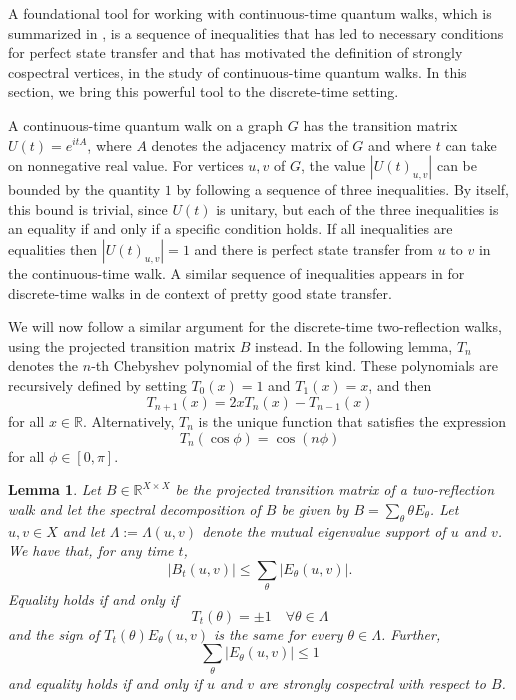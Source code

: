 \documentclass{article}
\newtheorem{lemma}[theorem]{Lemma}
\numberwithin{equation}{section}
\newcommand\re{{\mathbb R}}%
\begin{document}
A foundational tool for working with continuous-time quantum walks, which is summarized in \cite[Section 7.1]{CouGod2023book}, is a sequence of inequalities that has led to necessary conditions for perfect state transfer and that has motivated the definition of strongly cospectral vertices, in the study of continuous-time quantum walks.
In this section, we bring this powerful tool to the discrete-time setting.

A continuous-time quantum walk on a graph $G$ has the transition matrix
$U(t) = e^{itA}$,
where $A$ denotes the adjacency matrix of $G$ and where $t$ can take on nonnegative real value. For vertices $u,v$ of $G$,  the value $|U(t)_{u,v}|$ can be bounded by the quantity $1$ by following a sequence of three inequalities. By itself, this bound is trivial, since $U(t)$ is unitary, but each of the three inequalities is an equality if and only if a specific condition holds. If all inequalities are equalities then $|U(t)_{u,v}| = 1$ and there is perfect state transfer from $u$ to $v$ in the continuous-time walk. A similar sequence of inequalities appears in \cite{ChaZha2023} for discrete-time walks in de context of pretty good state transfer.

We will now follow a similar argument for the discrete-time two-reflection walks,  using the projected transition matrix $B$ instead. In the following lemma, $T_n$ denotes the $n$-th Chebyshev polynomial of the first kind. These polynomials are recursively defined by setting $T_0(x) = 1$ and $T_1(x) = x$, and then 
\[
T_{n+1}(x) = 2xT_n(x) - T_{n-1}(x)
\]
for all $x \in \re$. Alternatively, $T_n$ is the unique function that satisfies the expression
\begin{equation}
\label{eq:chebyshev_expression}
T_n(\cos\phi) = \cos(n\phi)
\end{equation}
for all $\phi \in [0,\pi]$.

\begin{lemma}
\label{lem:technical_lemma}
    Let $B \in \re^{X \times X}$ be the projected transition matrix of a two-reflection walk and let the spectral decomposition of $B$ be given by $B = \sum_{\theta} \theta E_{\theta}$. Let $u,v \in X$ and let $\Lambda := \Lambda(u,v)$ denote the mutual eigenvalue support of $u$ and $v$. We have that, for any time $t$,
    \[
    |B_t(u,v)| \leq \sum_{\theta} |E_{\theta}(u,v)|.
    \]
   Equality holds if and only if 
   \[
   T_t(\theta) = \pm 1 \quad \forall \theta \in \Lambda
   \]
   and the sign of $T_t(\theta) E_{\theta}(u,v)$ is the same for every $\theta \in \Lambda$. Further,
   \[ \sum_{\theta} |E_{\theta}(u,v)| \leq 1\]
   and equality holds if and only if $u$ and $v$ are strongly cospectral with respect to $B$.
\end{lemma}
\end{document}
